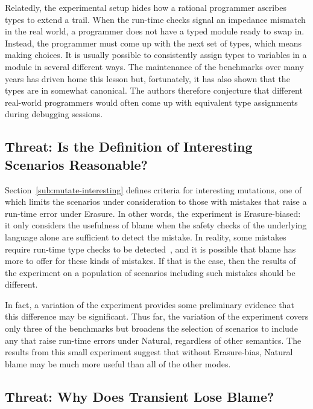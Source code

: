 Relatedly, the experimental setup hides how a rational programmer ascribes types
to extend a trail. When the run-time checks signal an impedance mismatch in the
real world, a programmer does not have a typed module ready to swap
in. Instead, the programmer must come up with the next set of types, which means
making choices. It is usually possible to consistently assign types to variables
in a module in several different ways. The maintenance of the benchmarks over many years
has driven home this lesson but, fortunately, it has also shown that the types
are in somewhat canonical.  The authors therefore conjecture that different
real-world programmers would often come up with equivalent type assignments
during debugging sessions. 

\subsection{Threat: Is the Definition of Interesting Scenarios Reasonable?} \label{sec:threat:erasure-bias}

Section~\ref{sub:mutate-interesting} defines criteria for interesting mutations,
one of which limits the scenarios under consideration to those with mistakes
that raise a run-time error under Erasure. In other words, the experiment is
Erasure-biased: it only considers the usefulness of blame when the safety checks
of the underlying language alone are sufficient to detect the mistake. In
reality, some mistakes require run-time type checks to be
detected~\cite{gfd-oopsla-2019}, and it is possible that blame has more 
to offer for these kinds of mistakes. If that is the case, then the results of
the experiment on a population of scenarios including such mistakes should be
different.

In fact, a variation of the experiment provides
some preliminary evidence that this difference may be significant. Thus far,
the variation of the experiment covers only three of the
benchmarks but broadens the selection of scenarios to include any that raise
run-time errors under Natural, regardless of other semantics. The 
results from this small experiment suggest that without Erasure-bias, Natural blame
may be much more useful than all of the other modes.

\subsection{Threat: Why Does Transient Lose Blame?} \label{sec:threat:transient}

